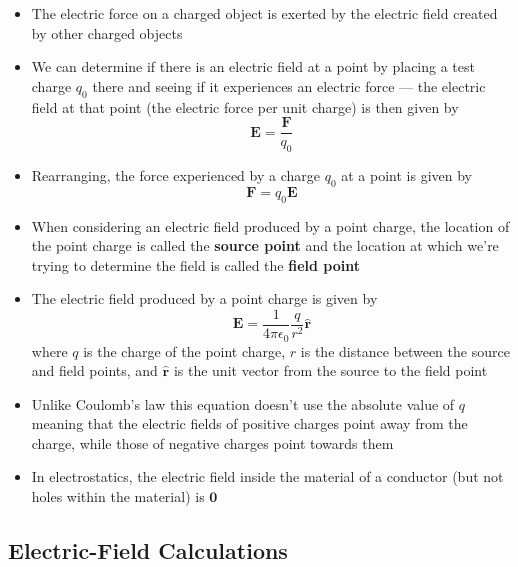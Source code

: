 \documentclass{article}
\begin{document}
\begin{itemize}
  \item The electric force on a charged object is exerted by the electric field created by other charged objects

  \item We can determine if there is an electric field at a point by placing a test charge $q_0$ there and seeing if it experiences an electric force — the electric field at that point (the electric force per unit charge) is then given by \[\mathbf{E} = \frac{\mathbf{F}}{q_0}\]

  \item Rearranging, the force experienced by a charge $q_0$ at a point is given by \[\mathbf{F} = q_0\mathbf{E}\]

  \item When considering an electric field produced by a point charge, the location of the point charge is called the \textbf{source point} and the location at which we're trying to determine the field is called the \textbf{field point}

  \item The electric field produced by a point charge is given by \[\mathbf{E} = \frac{1}{4\pi\epsilon_0} \frac{q}{r^2}\hat{\mathbf{r}}\] where $q$ is the charge of the point charge, $r$ is the distance between the source and field points, and $\hat{\mathbf{r}}$ is the unit vector from the source to the field point

  \item Unlike Coulomb's law this equation doesn't use the absolute value of $q$ meaning that the electric fields of positive charges point away from the charge, while those of negative charges point towards them

  \item In electrostatics, the electric field inside the material of a conductor (but not holes within the material) is $\mathbf{0}$
\end{itemize}

\subsection{Electric-Field Calculations}
\end{document}
